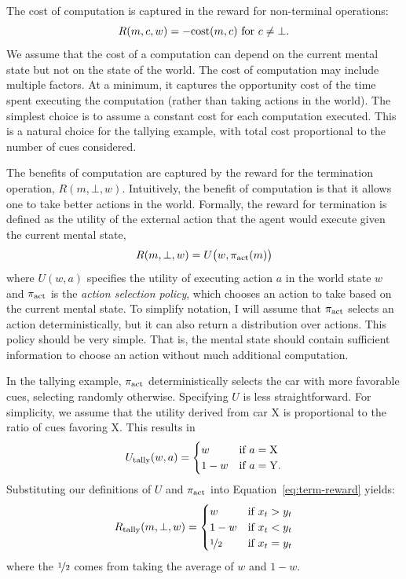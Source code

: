 The cost of computation is captured in the reward for non-terminal operations:
%
\begin{equation}
R(m, c, w) = -\text{cost}(m, c) \text{ for } c \neq \bot.
\end{equation}
%
We assume that the cost of a computation can depend on the current mental state but not on the state of the world. The cost of computation may include multiple factors. At a minimum, it captures the opportunity cost of the time spent executing the computation (rather than taking actions in the world). The simplest choice is to assume a constant cost for each computation executed. This is a natural choice for the tallying example, with total cost proportional to the number of cues considered.

The benefits of computation are captured by the reward for the termination operation, $R(m, \bot, w)$. Intuitively, the benefit of computation is that it allows one to take better actions in the world. Formally, the reward for termination is defined as the utility of the external action that the agent would execute given the current mental state,
%
\begin{equation}\label{eq:term-reward}
  R(m, \bot, w) = U \big(w, \pi_{\text{act}}(m) \big)
\end{equation}
%
where $U(w, a)$ specifies the utility of executing action $a$ in the world state $w$ and $\pi_{\text{act}}$ is the \emph{action selection policy}, which chooses an action to take based on the current mental state. To simplify notation, I will assume that $\pi_{\text{act}}$ selects an action deterministically, but it can also return a distribution over actions. This policy should be very simple. That is, the mental state should contain sufficient information to choose an action without much additional computation.

In the tallying example, $\pi_{\text{act}}$ deterministically selects the car with more favorable cues, selecting randomly otherwise. Specifying $U$ is less straightforward. For simplicity, we assume that the utility derived from car X is proportional to the ratio of cues favoring X. This results in
\begin{equation}
  U_{\text{tally}}(w, a) = \begin{cases}
    w &\text{if } a = \mathrm{X} \\
    1-w &\text{if } a = \mathrm{Y}.
  \end{cases}
\end{equation}
Substituting our definitions of $U$ and $\pi_{\text{act}}$ into Equation~\ref{eq:term-reward} yields:
\begin{equation}
  R_{\text{tally}}(m, \bot, w) = \begin{cases}
    w &\text{if } x_t > y_t \\
    1-w &\text{if } x_t < y_t \\
    \nicefrac{1}{2} &\text{if } x_t = y_t
  \end{cases}
\end{equation}
where the $\nicefrac{1}{2}$ comes from taking the average of $w$ and $1 - w$.

